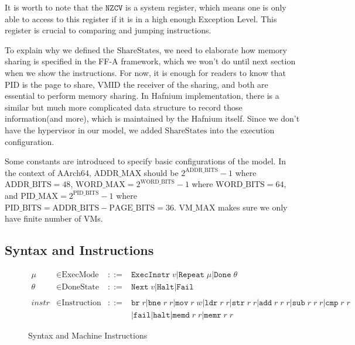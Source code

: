 \documentclass[a4paper]{article}
\newcommand*{\derived}{::=}
\newcommand*{\SSS}{\text{ShareStates}}
\newcommand*{\PID}{\text{PID}}
\newcommand*{\VMID}{\text{VMID}}
\newcommand*{\MODE}{\text{ExecMode}}
\newcommand*{\DONE}{\text{DoneState}}
\newcommand*{\INSTR}{\text{Instruction}}
\newcommand*{\PABITS}{\text{ADDR\_BITS}}
\newcommand*{\PPBITS}{\text{PAGE\_BITS}}
\newcommand*{\PPIDBITS}{\text{PID\_BITS}}
\newcommand*{\PAMAX}{\text{ADDR\_MAX}}
\newcommand*{\PPIDMAX}{\text{PID\_MAX}}
\newcommand*{\PWBITS}{\text{WORD\_BITS}}
\newcommand*{\PWMAX}{\text{WORD\_MAX}}
\newcommand*{\PVMMAX}{\text{VM\_MAX}}
\newcommand*{\instrm}[1]{\mathtt{#1}}
\newcommand*{\NXT}[1]{\mathtt{Next} \; {#1}}
\begin{document}
It is worth to note that the $\mathtt{NZCV}$ is a system register, which means one
is only able to access to this register if it is in a high enough Exception Level. This register
is crucial to comparing and jumping instructions.

To explain why we defined the $\SSS$, we need to elaborate how memory sharing is
specified in the FF-A framework, which we won't do until next section when we
show the instructions. For now, it is enough for readers to know that $\PID$ is
the page to share, $\VMID$ the receiver of the sharing, and both are essential
to perform memory sharing. In Hafnium implementation, there is a similar but
much more complicated data structure to record those information(and more),
which is maintained by the Hafnium itself. Since we don't have the hypervisor in
our model, we added $\SSS$ into the execution configuration.

Some constants are introduced to specify basic configurations of the model. In
the context of AArch64, $\PAMAX$ should be $2^{\PABITS} - 1$ where
$\PABITS = 48$, $\PWMAX = 2^{\PWBITS} -1$ where $\PWBITS = 64$, and
$\PPIDMAX = 2^{\PPIDBITS}-1$ where $\PPIDBITS = \PABITS - \PPBITS = 36$.
$\PVMMAX$ makes sure we only have finite number of VMs.





\subsection{Syntax and Instructions}
\begin{figure}[h!]
  \begin{align*}
    \mu &\in \MODE &\derived & \mathtt{ExecInstr} \; v | \mathtt{Repeat} \; \mu | \mathtt{Done} \; \theta \\
    \theta &\in \DONE &\derived & \NXT{v} | \mathtt{Halt} | \mathtt{Fail}\\
    \\
    instr & \in  \INSTR &\derived & \instrm{br} \; r |\instrm{bne} \; r \; r |
                                    \instrm{mov} \; r \; w | \instrm{ldr} \; r\; r|
                                    \instrm{str} \; r \; r | \instrm{add} \; r \; r \; r |
                                    \instrm{sub} \; r \; r \; r | \instrm{cmp} \; r \; r \\
        & & & | \instrm{fail} | \instrm{halt} | \instrm{memd} \; r \; r | \instrm{memr} \; r\; r
  \end{align*}
  \caption{Syntax and Machine Instructions}
\end{figure}
\end{document}
